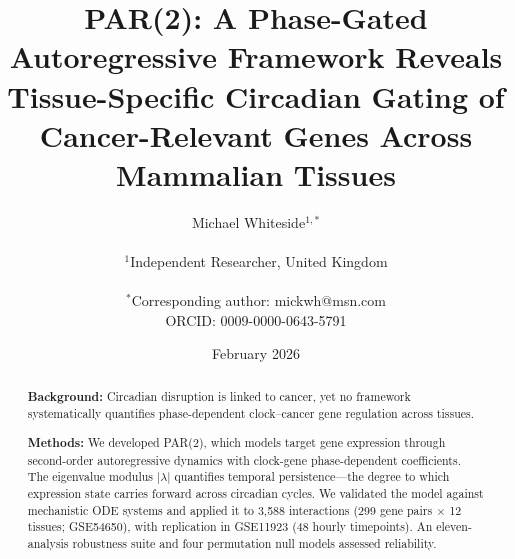 \documentclass[11pt,letterpaper]{article}
\title{\textbf{PAR(2): A Phase-Gated Autoregressive Framework Reveals Tissue-Specific Circadian Gating of Cancer-Relevant Genes Across Mammalian Tissues}}
\author{
Michael Whiteside$^{1,*}$ \\
\\
$^1$Independent Researcher, United Kingdom \\
\\
$^*$Corresponding author: mickwh@msn.com \\
ORCID: 0009-0000-0643-5791
}
\date{February 2026}
\begin{document}
\maketitle

\begin{abstract}
\noindent\textbf{Background:} Circadian disruption is linked to cancer, yet no framework systematically quantifies phase-dependent clock--cancer gene regulation across tissues.

\noindent\textbf{Methods:} We developed PAR(2), which models target gene expression through second-order autoregressive dynamics with clock-gene phase-dependent coefficients. The eigenvalue modulus $|\lambda|$ quantifies temporal persistence---the degree to which expression state carries forward across circadian cycles. We validated the model against mechanistic ODE systems and applied it to 3,588 interactions (299 gene pairs $\times$ 12 tissues; GSE54650), with replication in GSE11923 (48 hourly timepoints). An eleven-analysis robustness suite and four permutation null models assessed reliability.


\end{abstract}
\end{document}

